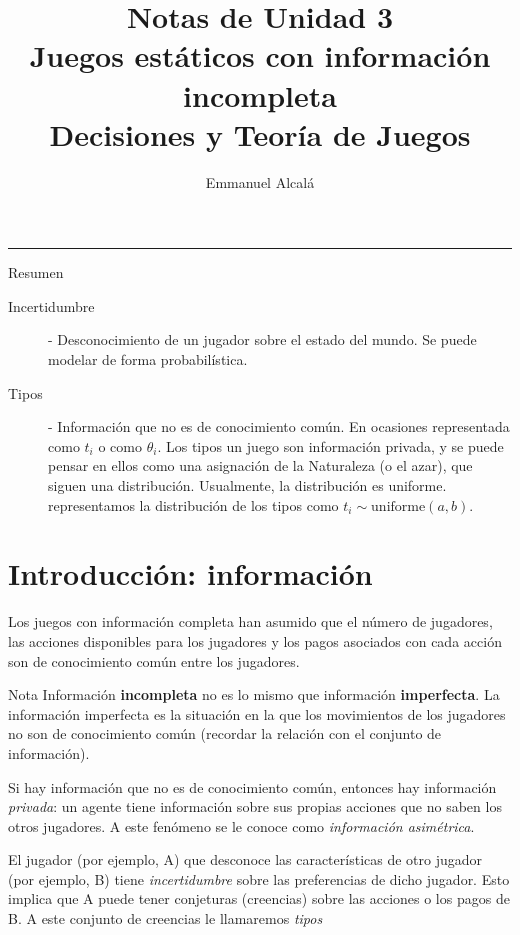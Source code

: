 \documentclass[12pt]{article}
\title{\sffamily Notas de Unidad 3\\ \textbf{Juegos estáticos con información incompleta}\\ \normalsize Decisiones y Teoría de Juegos}
\author{Emmanuel Alcalá}
\date{}
\begin{document}

\maketitle

\hrule

\begin{summarybox}{Resumen}
	\begin{description}
		\item[Incertidumbre] - Desconocimiento de un jugador sobre el estado del mundo. Se puede modelar de forma probabilística.
		\item[Tipos] - Información que no es de conocimiento común. En ocasiones representada como $ t_i $ o como $ \theta_i $. Los tipos un juego son información privada, y se puede pensar en ellos como una asignación de la Naturaleza (o el azar), que siguen una distribución. Usualmente, la distribución es uniforme. representamos la distribución de los tipos como $ t_i \sim \text{uniforme}(a, b) $.
	\end{description}
\end{summarybox}

\section{Introducción: información}


Los juegos con información completa han asumido que el número de jugadores, las acciones disponibles para los jugadores y los pagos asociados con cada acción son de conocimiento común entre los jugadores.

\begin{summarybox}[colback=red!15]{Nota}
	Información \textbf{incompleta} no es lo mismo que información \textbf{imperfecta}. La información imperfecta es la situación en la que los movimientos de los jugadores no son de conocimiento común (recordar la relación con el conjunto de información).
\end{summarybox}

Si hay información que no es de conocimiento común, entonces hay información \textit{privada}: un agente tiene información sobre sus propias acciones que no saben los otros jugadores. A este fenómeno se le conoce como \textit{información asimétrica}.

El jugador (por ejemplo, A) que desconoce las características de otro jugador (por ejemplo, B) tiene \textit{incertidumbre} sobre las preferencias de dicho jugador. Esto implica que A puede tener conjeturas (creencias) sobre las acciones o los pagos de B. A este conjunto de creencias le llamaremos \textit{tipos}
\end{document}
